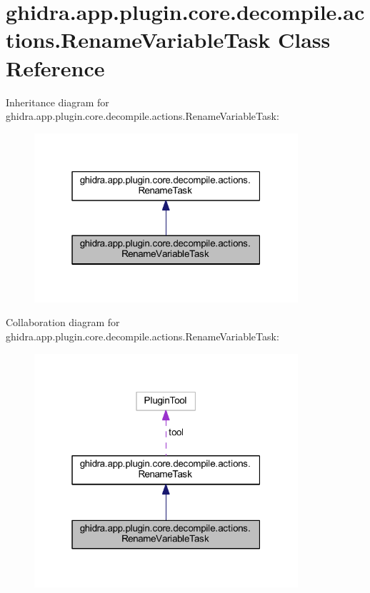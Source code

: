 \hypertarget{classghidra_1_1app_1_1plugin_1_1core_1_1decompile_1_1actions_1_1_rename_variable_task}{}\section{ghidra.\+app.\+plugin.\+core.\+decompile.\+actions.\+Rename\+Variable\+Task Class Reference}
\label{classghidra_1_1app_1_1plugin_1_1core_1_1decompile_1_1actions_1_1_rename_variable_task}


Inheritance diagram for ghidra.\+app.\+plugin.\+core.\+decompile.\+actions.\+Rename\+Variable\+Task\+:
\nopagebreak
\begin{figure}[H]
\begin{center}
\leavevmode
\includegraphics[width=277pt]{classghidra_1_1app_1_1plugin_1_1core_1_1decompile_1_1actions_1_1_rename_variable_task__inherit__graph}
\end{center}
\end{figure}


Collaboration diagram for ghidra.\+app.\+plugin.\+core.\+decompile.\+actions.\+Rename\+Variable\+Task\+:
\nopagebreak
\begin{figure}[H]
\begin{center}
\leavevmode
\includegraphics[width=277pt]{classghidra_1_1app_1_1plugin_1_1core_1_1decompile_1_1actions_1_1_rename_variable_task__coll__graph}
\end{center}
\end{figure}
